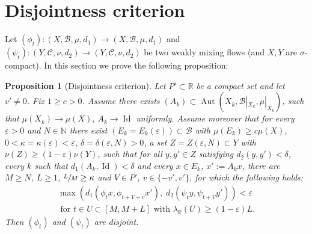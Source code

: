 \documentclass[11pt]{article}
\let\mathcal\mathscr
\let\epsilon\varepsilon
\DeclareMathOperator{\Aut}{Aut}
\DeclareMathOperator{\Id}{Id}
\theoremstyle{definition}
\theoremstyle{plain}
\newtheorem{proposition}[definition]{Proposition}
\newcommand\NN{\mathbb{N}}
\newcommand\RR{\mathbb{R}}
\newcommand\cB{\mathcal{B}}
\newcommand\cC{\mathcal{C}}
\begin{document}
\setcounter{equation}{1}\setcounter{section}{3}
\section{Disjointness criterion}\label{sec:disj}
Let $(\phi_t):(X,\cB,\mu,d_1)\to (X,\cB,\mu,d_1)$ and $(\psi_t):(Y,\cC,\nu,d_2)\to (Y,\cC,\nu,d_2)$ be two weakly mixing flows (and $X,Y$ are $\sigma$-compact). In this section we prove the following proposition:

\begin{proposition}[Disjointness criterion]\label{disjoint.flows}
Let $P'\subset \RR$ be a compact set and let $v'\neq 0$. Fix $1\geq c>0$. Assume there exists $(A_k)\subset \Aut(X_k,\cB|_{X_k},\mu|_{X_k})$, such that $\mu(X_k)\to \mu(X)$,
$A_k\to \Id$ uniformly.
Assume moreover that for every $\epsilon>0$ and $N\in \NN$
there exist $(E_k=E_k(\epsilon))\subset \cB$ with $\mu(E_k)\geq c\mu(X)$, $0<\kappa=\kappa(\epsilon)<\epsilon$, $\delta=\delta(\epsilon,N)>0$, a set $Z=Z(\epsilon,N)\subset Y$ with $\nu(Z)\geq (1-\epsilon)\nu(Y)$, such that for all $y,y'\in Z$ satisfying $d_2(y,y')<\delta$, every $k$ such that $d_1(A_k,\Id)<\delta$ and every $x\in E_k$, $x':=A_{k}x$, there are $M\geq N$, $L\geq 1$, $\sfrac{L}{M}\geq \kappa$ and $V\in P'$, $v\in\{-v',v'\}$,
for which the following holds:\vspace*{-5pt}
\begin{multline}\label{forw}
\max(d_1(\phi_tx,\phi_{t+V+v}x'),\;d_2(\psi_ty,\psi_{t+V}y'))<\epsilon\\ \text{ for } t\in U\subset [M,M+L]
\text{ with } \lambda_\RR(U)\geq (1-\epsilon)L.
\end{multline}
Then $(\phi_t)$ and $(\psi_t)$ are disjoint.
\end{proposition}
\end{document}
